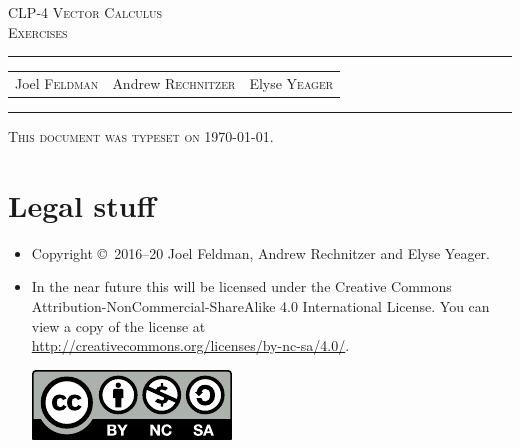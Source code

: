 \documentclass[12pt,letterpaper, openany]{book}
\begin{document}
\setcounter{page}{0}


\begin{titlepage} 
\begin{center} 
\textsc{\LARGE
CLP-4 Vector Calculus \\[2ex]
Exercises
}\\[2ex]

\vspace{5ex}
\hrule
\vspace{5ex}

\begin{tabular}{ccc}
\large  Joel \textsc{Feldman}  
& \large \qquad Andrew \textsc{Rechnitzer} 
&\large  \qquad Elyse \textsc{Yeager}
\end{tabular}

\end{center}
\vspace{2ex}
\hrule

\vfill
\textsc{This document was typeset on \today.}
\end{titlepage}

\section*{Legal stuff}
\begin{itemize}
 \item Copyright \copyright\ 2016--20 Joel Feldman, Andrew Rechnitzer and Elyse Yeager.

\item In the near future this will be licensed under the 
Creative Commons Attribution-NonCommercial-ShareAlike 4.0 International 
License. You can view a copy of the license at \\
\url{http://creativecommons.org/licenses/by-nc-sa/4.0/}.
\begin{center}
 \includegraphics{figures/by-nc-sa.pdf}
\end{center}
\end{itemize}

\newpage
\end{document}
